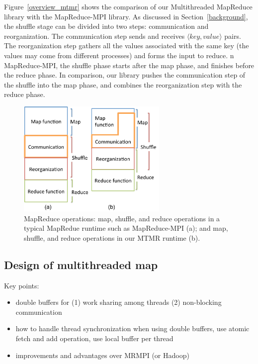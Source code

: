Figure~\ref{overview_mtmr} shows the comparison of our 
Multithreaded MapReduce library with the MapReduce-MPI library.
As discussed in Section~\ref{background}, the shuffle stage
can be divided into two steps: communication and reorganization. The 
communication step sends and receives $\langle key, value \rangle$  pairs. 
The reorganization step gathers all the values associated with
the same key (the values may come from different processes) and 
forms the input to reduce. 
n MapReduce-MPI, the
shuffle phase starts after the map phase, and finishes before the
reduce phase. In comparison, our library pushes the communication
step of the shuffle into the map phase, and combines the reorganization
step with the reduce phase.
\begin{figure}[!htb]
\centering
  \includegraphics[width=0.9\linewidth,height=2.2in]{figs/overview_mtmr.pdf}
  \caption{MapReduce operations: map, shuffle, and reduce operations in a
  typical MapRedue runtime such as MapReduce-MPI (a); and map, shuffle, and
  reduce operations in our MTMR runtime (b).}
  \label{fig:overview_mtmr}
\end{figure}

\subsection{Design of multithreaded map}

Key points:
\begin{itemize}
\item double buffers for (1) work sharing among threads (2) non-blocking 
communication
\item how to handle thread synchronization when using double buffers,
use atomic fetch and add operation, use local buffer per thread
\item improvements and advantages over MRMPI (or Hadoop)
\end{itemize}

